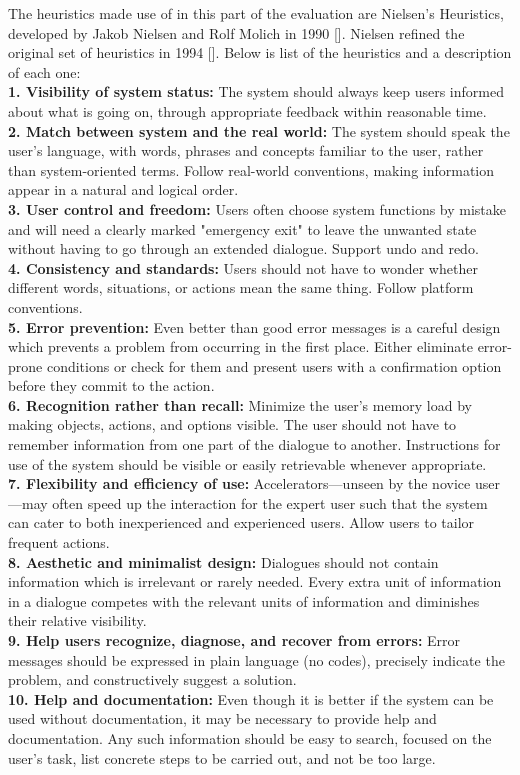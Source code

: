 The heuristics made use of in this part of the evaluation are Nielsen's Heuristics, developed by Jakob Nielsen and Rolf Molich in 1990 []. Nielsen refined the original set of heuristics in 1994 []. Below is list of the heuristics and a description of each one:
\\
\textbf{1. Visibility of system status:}
The system should always keep users informed about what is going on, through appropriate feedback within reasonable time.
\\
\textbf{2. Match between system and the real world:}
The system should speak the user's language, with words, phrases and concepts familiar to the user, rather than system-oriented terms. Follow real-world conventions, making information appear in a natural and logical order.
\\
\textbf{3. User control and freedom:}
Users often choose system functions by mistake and will need a clearly marked "emergency exit" to leave the unwanted state without having to go through an extended dialogue. Support undo and redo.
\\
\textbf{4. Consistency and standards:}
Users should not have to wonder whether different words, situations, or actions mean the same thing. Follow platform conventions.
\\
\textbf{5. Error prevention:}
Even better than good error messages is a careful design which prevents a problem from occurring in the first place. Either eliminate error-prone conditions or check for them and present users with a confirmation option before they commit to the action.
\\
\textbf{6. Recognition rather than recall:}
Minimize the user's memory load by making objects, actions, and options visible. The user should not have to remember information from one part of the dialogue to another. Instructions for use of the system should be visible or easily retrievable whenever appropriate.
\\
\textbf{7. Flexibility and efficiency of use:}
Accelerators—unseen by the novice user—may often speed up the interaction for the expert user such that the system can cater to both inexperienced and experienced users. Allow users to tailor frequent actions.
\\
\textbf{8. Aesthetic and minimalist design:}
Dialogues should not contain information which is irrelevant or rarely needed. Every extra unit of information in a dialogue competes with the relevant units of information and diminishes their relative visibility.
\\
\textbf{9. Help users recognize, diagnose, and recover from errors:}
Error messages should be expressed in plain language (no codes), precisely indicate the problem, and constructively suggest a solution.
\\
\textbf{10. Help and documentation:}
Even though it is better if the system can be used without documentation, it may be necessary to provide help and documentation. Any such information should be easy to search, focused on the user's task, list concrete steps to be carried out, and not be too large.\\

